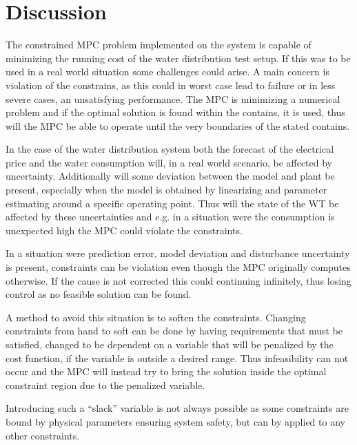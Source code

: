 \chapter{Discussion}
\label{Discussion}

The constrained MPC problem implemented on the system is capable of minimizing the running cost of the water distribution test setup. If this was to be used in a real world situation some challenges could arise. A main concern is violation of the constrains, as this could in worst case lead to failure or in less severe cases, an unsatisfying performance. 
The MPC is minimizing a numerical problem and if the optimal solution is found within the contains, it is used, thus will the MPC be able to operate until the very boundaries of the stated contains. 

In the case of the water distribution system both the forecast of the electrical price and the water consumption will, in a real world scenario, be affected by uncertainty. Additionally will some deviation between the model and plant be present, especially when the model is obtained by linearizing and parameter estimating around a specific operating point. Thus will the state of the WT be affected by these uncertainties and e.g. in a situation were the consumption is unexpected high the MPC could violate the constraints. 

In a situation were prediction error, model deviation and disturbance uncertainty is present, constraints can be violation even though the MPC originally computes otherwise. If the cause is not corrected this could continuing infinitely, thus losing control as no feasible solution can be found.    

A method to avoid this situation is to soften the constraints. Changing constraints from hand to soft can be done by having requirements that must be satisfied, changed to be dependent on a variable that will be penalized by the cost function, if the variable is outside a desired range. Thus infeasibility can not occur and the MPC will instead try to bring the solution inside the optimal constraint region due to the penalized variable.   

Introducing such a ``slack'' variable is not always possible as some constraints are bound by physical parameters ensuring system safety, but can by applied to any other constraints. 

